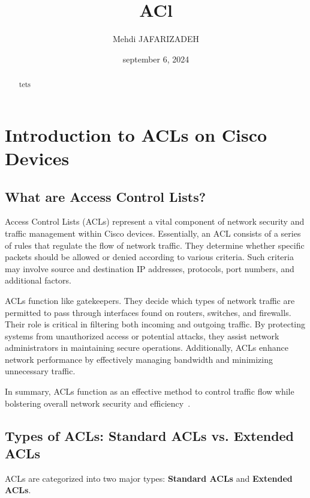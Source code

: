 \documentclass[11pt,a4paper]{article}
\title{ACl}
\author{Mehdi JAFARIZADEH}
\date{september 6, 2024}
\begin{document}
\maketitle

\begin{abstract}
    tets
\end{abstract}

\newpage

\section*{Introduction to ACLs on Cisco Devices}
    \subsection*{What are Access Control Lists?}
    Access Control Lists (ACLs) represent a vital component of network security and traffic management within Cisco devices. Essentially, an ACL consists of a series of rules that regulate the flow of network traffic. They determine whether specific packets should be allowed or denied according to various criteria. Such criteria may involve source and destination IP addresses, protocols, port numbers, and additional factors.

    ACLs function like gatekeepers. They decide which types of network traffic are permitted to pass through interfaces found on routers, switches, and firewalls. Their role is critical in filtering both incoming and outgoing traffic. By protecting systems from unauthorized access or potential attacks, they assist network administrators in maintaining secure operations. Additionally, ACLs enhance network performance by effectively managing bandwidth and minimizing unnecessary traffic.

    In summary, ACLs function as an effective method to control traffic flow while bolstering overall network security and efficiency~\cite{Introduction}.

    

    \subsection*{Types of ACLs: Standard ACLs vs. Extended ACLs}
    ACLs are categorized into two major types: \textbf{Standard ACLs} and \textbf{Extended ACLs}.
\end{document}
